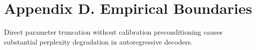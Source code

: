 \section*{Appendix D. Empirical Boundaries}
Direct parameter truncation without calibration preconditioning causes substantial perplexity degradation in autoregressive decoders.
